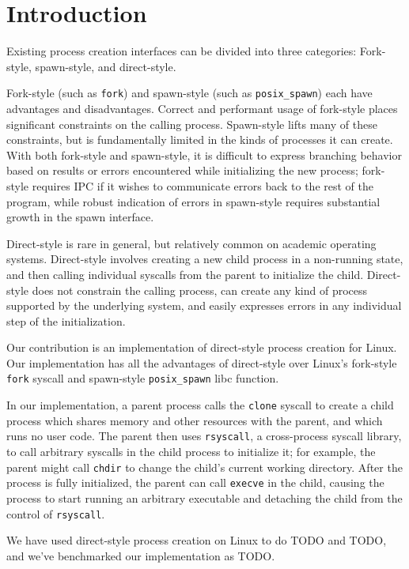 \documentclass{acmart}
\begin{document}
\section{Introduction}\label{introduction}
Existing process creation interfaces can be divided into three categories:
Fork-style, spawn-style, and direct-style.

Fork-style (such as \texttt{fork}) and spawn-style (such as \texttt{posix\_spawn}) each have advantages and disadvantages.
Correct and performant usage of fork-style places significant constraints on the calling process.
Spawn-style lifts many of these constraints,
but is fundamentally limited in the kinds of processes it can create.
With both fork-style and spawn-style,
it is difficult to express
branching behavior based on results or errors encountered while initializing the new process;
fork-style requires IPC if it wishes to communicate errors back to the rest of the program,
while robust indication of errors in spawn-style requires substantial growth in the spawn interface.

Direct-style is rare in general, but relatively common on academic operating systems.
Direct-style involves creating a new child process in a non-running state,
and then calling individual syscalls from the parent to initialize the child.
Direct-style does not constrain the calling process,
can create any kind of process supported by the underlying system,
and easily expresses errors in any individual step of the initialization.

Our contribution is an implementation of direct-style process creation for Linux.
Our implementation has all the advantages of direct-style
over Linux's fork-style \texttt{fork} syscall and spawn-style \texttt{posix\_spawn} libc function.

In our implementation, a parent process calls the \texttt{clone} syscall
to create a child process which shares memory and other resources with the parent,
and which runs no user code.
The parent then uses \texttt{rsyscall}, a cross-process syscall library,
to call arbitrary syscalls in the child process to initialize it;
for example, the parent might call \texttt{chdir} to change the child's current working directory.
After the process is fully initialized,
the parent can call \texttt{execve} in the child,
causing the process to start running an arbitrary executable
and detaching the child from the control of \texttt{rsyscall}.

We have used direct-style process creation on Linux to do TODO and TODO,
and we've benchmarked our implementation as TODO.
\end{document}
